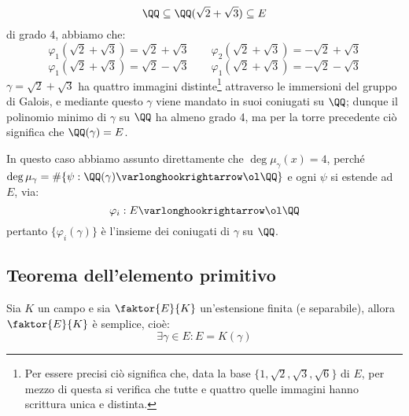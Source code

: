 \documentclass[11pt]{scrartcl}
\begin{document}
\begin{example}
    \[ \QQ \subseteq \QQ(\sqrt{2} + \sqrt{3}) \subseteq E
        \]
    di grado 4, abbiamo che:
    \[ \varphi_1(\sqrt{2}+\sqrt{3}) = \sqrt{2} + \sqrt{3} \qquad \varphi_2(\sqrt{2}+\sqrt{3}) = -\sqrt{2} + \sqrt{3}
        \]\[ \varphi_1(\sqrt{2}+\sqrt{3}) = \sqrt{2} - \sqrt{3} \qquad \varphi_1(\sqrt{2}+\sqrt{3}) = - \sqrt{2} - \sqrt{3}
            \]
    $\gamma = \sqrt{2}+\sqrt{3}$ ha quattro immagini distinte\footnote{Per essere precisi ciò significa che, data
    la base $\{1,\sqrt2,\sqrt3,\sqrt6\}$ di $E$, per mezzo di questa si verifica che tutte e quattro quelle immagini hanno scrittura unica e distinta.}
    attraverso le immersioni del gruppo di Galois, e mediante questo $\gamma$ viene mandato in suoi coniugati su $\QQ$;
    dunque il polinomio minimo di $\gamma$ su $\QQ$ ha almeno grado 4, ma per la torre precedente ciò significa che $\QQ(\gamma) = E$.
\end{example}

\begin{remark}
    In questo caso abbiamo assunto direttamente che $\deg \mu_\gamma (x) = 4$, perché $\deg \mu_\gamma = \#\{\psi : \QQ(\gamma) \varlonghookrightarrow \ol\QQ\}$ e ogni $\psi$ si 
    estende ad $E$, via:
    \[ \varphi_i : E \varlonghookrightarrow \ol \QQ
        \]
    pertanto $\{\varphi_i(\gamma)\}$ è l'insieme dei coniugati di $\gamma$ su $\QQ$.
\end{remark}

\newpage
\subsection{Teorema dell'elemento primitivo}
\begin{theorem}
    \label{prim}
    Sia $K$ un campo e sia $\faktor{E}{K}$ un'estensione finita (e separabile), allora $\faktor{E}{K}$ è semplice, cioè:
    \[ \exists\gamma \in E : E = K(\gamma)
        \] 
\end{theorem}
\end{document}
